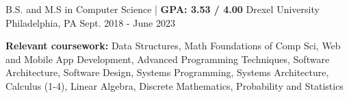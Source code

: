 

\begin{cventries}

  \cventry
  {B.S. and M.S in Computer Science | \textbf{ GPA: 3.53 / 4.00}} %
  {Drexel University} %
  {Philadelphia, PA} %
  {Sept. 2018 - June 2023} %
  {
    \begin{cvitems} %
      \item {\color{darktext} \textbf{Relevant coursework:}}
      Data Structures, Math Foundations of Comp Sci, Web and Mobile App Development, Advanced Programming Techniques,
      Software Architecture, Software Design, Systems Programming, Systems Architecture,
      Calculus (1-4), Linear Algebra, Discrete Mathematics, Probability and Statistics
    \end{cvitems}
  }

\end{cventries}
